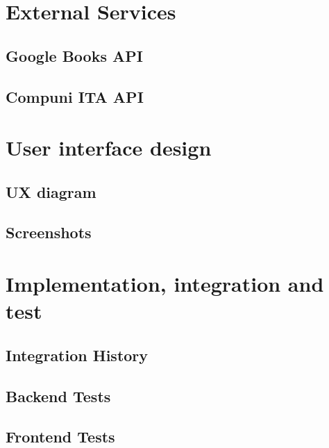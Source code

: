 \chapter{External Services}

\section{Google Books API}

\section{Compuni ITA API}



\chapter{User interface design}

\section{UX diagram}

\section{Screenshots}



\chapter{Implementation, integration and test}

\section{Integration History}

\section{Backend Tests}

\section{Frontend Tests}



